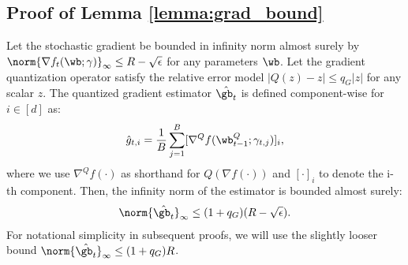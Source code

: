 \documentclass[11pt, letterpaper]{article}
\begin{document}
\subsection{Proof of Lemma \ref{lemma:grad_bound}}
\begin{lemma}
\label{lemma:grad_bound}
Let the stochastic gradient be bounded in infinity norm almost surely by $\norm{\nabla f_t(\wb; \gamma)}_\infty \le R - \sqrt{\epsilon}$ for any parameters $\wb$. Let the gradient quantization operator satisfy the relative error model $|Q(z) - z| \le q_G|z|$ for any scalar $z$. The quantized gradient estimator $\hat{\gb_t}$ is defined component-wise for $i \in [d]$ as:
\begin{align}
    \hat{g}_{t,i} = \frac{1}{B}\sum_{j=1}^{B} [\nabla^Q f(\wb_{t-1}^Q; \gamma_{t,j})]_i,
\end{align}
where we use $\nabla^Q f(\cdot)$ as shorthand for $Q(\nabla f(\cdot))$ and $[\cdot]_i$ to denote the i-th component. Then, the infinity norm of the estimator is bounded almost surely:
\begin{align}
    \norm{\hat{\gb_t}}_\infty \le (1+q_G)(R - \sqrt{\epsilon}).
\end{align}
For notational simplicity in subsequent proofs, we will use the slightly looser bound $\norm{\hat{\gb_t}}_\infty \le (1+q_G)R$.
\end{lemma}
\end{document}
